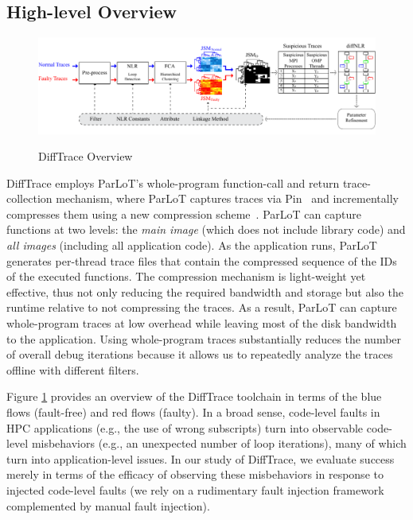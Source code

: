 \subsection{High-level Overview}

\begin{figure}[]
\caption{DiffTrace Overview}
\includegraphics[width=1\textwidth]{figs/overview4.pdf}
\label{fig.diffTraceOverview}
\end{figure}

DiffTrace employs ParLoT's whole-program function-call and return trace-collection mechanism, where ParLoT captures traces via Pin~\cite{pin} and incrementally compresses them using a new compression scheme~\cite{parlot}.
%
ParLoT can capture functions at two levels:
the \textit{main image} (which does not include library code)
and \textit{all images} (including all application code).
%
As the application runs,
ParLoT generates per-thread trace files that
contain the compressed sequence of the IDs of the executed functions.
%
The compression mechanism is light-weight yet effective,
thus not only reducing the required bandwidth and storage but also the
runtime relative to not compressing the traces.
As a result, ParLoT can capture whole-program traces at low overhead
while leaving most of the disk bandwidth to the application. 
%
Using whole-program traces substantially reduces the number of overall
debug iterations because it allows us to repeatedly analyze the
traces offline with different filters.


Figure \ref{fig.diffTraceOverview} provides an overview
of the DiffTrace toolchain
in terms of the blue flows (fault-free) and red flows
(faulty).
%
In a broad sense,
code-level faults in HPC applications (e.g.,
the use of wrong subscripts) turn into observable code-level
misbehaviors
(e.g., an unexpected number of loop iterations), many of which
turn into application-level issues.
%
In our study of DiffTrace, we evaluate
success merely in terms of the efficacy of observing
these misbehaviors in response to injected code-level
faults (we rely on a rudimentary fault injection framework
complemented by manual fault injection).

